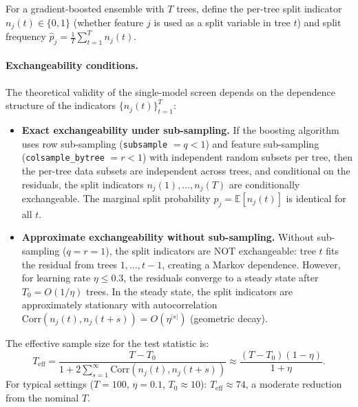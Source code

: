 \documentclass{jmlr}
\newcommand{\E}{\mathbb{E}}
\begin{document}
For a gradient-boosted ensemble with $T$ trees, define the per-tree split indicator $n_j(t) \in \{0,1\}$ (whether feature $j$ is used as a split variable in tree $t$) and split frequency $\hat{p}_j = \frac{1}{T}\sum_{t=1}^T n_j(t)$.

\paragraph{Exchangeability conditions.}
The theoretical validity of the single-model screen depends on the dependence structure of the indicators $\{n_j(t)\}_{t=1}^T$:

\begin{itemize}
    \item \textbf{Exact exchangeability under sub-sampling.} If the boosting algorithm uses row sub-sampling (\texttt{subsample} $= q < 1$) and feature sub-sampling (\texttt{colsample\_bytree} $= r < 1$) with independent random subsets per tree, then the per-tree data subsets are independent across trees, and conditional on the residuals, the split indicators $n_j(1), \ldots, n_j(T)$ are conditionally exchangeable. The marginal split probability $p_j = \E[n_j(t)]$ is identical for all $t$.

    \item \textbf{Approximate exchangeability without sub-sampling.} Without sub-sampling ($q = r = 1$), the split indicators are NOT exchangeable: tree $t$ fits the residual from trees $1, \ldots, t-1$, creating a Markov dependence. However, for learning rate $\eta \leq 0.3$, the residuals converge to a steady state after $T_0 = O(1/\eta)$ trees. In the steady state, the split indicators are approximately stationary with autocorrelation $\text{Corr}(n_j(t), n_j(t+s)) = O(\eta^{|s|})$ (geometric decay).
\end{itemize}

The effective sample size for the test statistic is:
\[
    T_{\text{eff}} = \frac{T - T_0}{1 + 2\sum_{s=1}^\infty \text{Corr}(n_j(t), n_j(t+s))} \approx \frac{(T - T_0)(1 - \eta)}{1 + \eta}.
\]
For typical settings ($T = 100$, $\eta = 0.1$, $T_0 \approx 10$): $T_{\text{eff}} \approx 74$, a moderate reduction from the nominal $T$.
\end{document}
